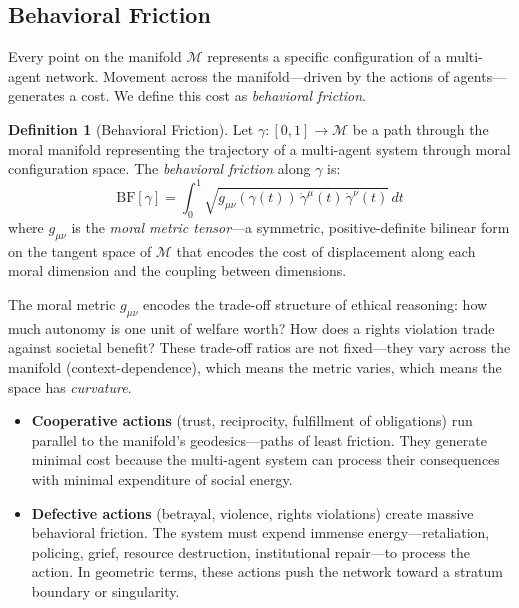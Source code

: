 \documentclass[12pt,letterpaper]{article}
\theoremstyle{definition}
\newtheorem{definition}[theorem]{Definition}
\theoremstyle{remark}
\newcommand{\M}{\mathcal{M}}
\newcommand{\BF}{\mathrm{BF}}
\begin{document}
\subsection{Behavioral Friction}

Every point on the manifold $\M$ represents a specific configuration of a multi-agent network. Movement across the manifold---driven by the actions of agents---generates a cost. We define this cost as \emph{behavioral friction}.

\begin{definition}[Behavioral Friction]
\label{def:friction}
Let $\gamma: [0,1] \to \M$ be a path through the moral manifold representing the trajectory of a multi-agent system through moral configuration space. The \emph{behavioral friction} along $\gamma$ is:
\begin{equation}
\BF[\gamma] = \int_0^1 \sqrt{g_{\mu\nu}(\gamma(t))\, \dot{\gamma}^\mu(t)\, \dot{\gamma}^\nu(t)}\, dt
\label{eq:friction}
\end{equation}
where $g_{\mu\nu}$ is the \emph{moral metric tensor}---a symmetric, positive-definite bilinear form on the tangent space of $\M$ that encodes the cost of displacement along each moral dimension and the coupling between dimensions.
\end{definition}

The moral metric $g_{\mu\nu}$ encodes the trade-off structure of ethical reasoning: how much autonomy is one unit of welfare worth? How does a rights violation trade against societal benefit? These trade-off ratios are not fixed---they vary across the manifold (context-dependence), which means the metric varies, which means the space has \emph{curvature}.

\begin{itemize}
    \item \textbf{Cooperative actions} (trust, reciprocity, fulfillment of obligations) run parallel to the manifold's geodesics---paths of least friction. They generate minimal cost because the multi-agent system can process their consequences with minimal expenditure of social energy.
    \item \textbf{Defective actions} (betrayal, violence, rights violations) create massive behavioral friction. The system must expend immense energy---retaliation, policing, grief, resource destruction, institutional repair---to process the action. In geometric terms, these actions push the network toward a stratum boundary or singularity.
\end{itemize}
\end{document}
